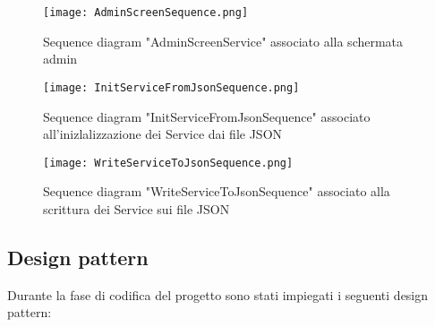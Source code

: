 \documentclass{article}
\begin{document}
\begin{center}
    \begin{figure}[H]
        \centering
        \caption{Sequence diagram "AdminScreenService" associato alla schermata admin}
        \texttt{[image: AdminScreenSequence.png]}
    \end{figure}
\end{center}

\begin{center}
    \begin{figure}[H]
        \centering
        \caption{Sequence diagram "InitServiceFromJsonSequence" associato all'inizlalizzazione dei Service dai file JSON}
        \texttt{[image: InitServiceFromJsonSequence.png]}
    \end{figure}
\end{center}

\begin{center}
    \begin{figure}[H]
        \centering
        \caption{Sequence diagram "WriteServiceToJsonSequence" associato alla scrittura dei Service sui file JSON}
        \texttt{[image: WriteServiceToJsonSequence.png]}
    \end{figure}
\end{center}

\newpage


\subsection{Design pattern}

Durante la fase di codifica del progetto sono stati impiegati i seguenti design pattern:
\end{document}
